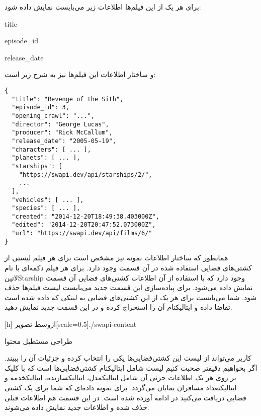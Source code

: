 برای هر یک از این فیلم‌ها اطلاعات زیر می‌بایست نمایش داده شود:

\begin{itemize}\begin{latinitems}
  \item title
  \item episode\_id
  \item release\_date
\end{latinitems}\end{itemize}

و ساختار اطلاعات این فیلم‌ها نیز به شرح زیر است:

\begin{latin}
\begin{verbatim}
{
  "title": "Revenge of the Sith",
  "episode_id": 3,
  "opening_crawl": "...",
  "director": "George Lucas",
  "producer": "Rick McCallum",
  "release_date": "2005-05-19",
  "characters": [ ... ],
  "planets": [ ... ],
  "starships": [
    "https://swapi.dev/api/starships/2/",
    ...
  ],
  "vehicles": [ ... ],
  "species": [ ... ],
  "created": "2014-12-20T18:49:38.403000Z",
  "edited": "2014-12-20T20:47:52.073000Z",
  "url": "https://swapi.dev/api/films/6/"
}
\end{verbatim}
\end{latin}

همانطور که ساختار اطلاعات نمونه نیز مشخص است برای هر فیلم لیستی از کشتی‌های فضایی استفاده شده در آن قسمت وجود دارد.
برای هر فیلم دکمه‌ای با نام ‌لاتین{Starship} وجود دارد که با استفاده از آن اطلاعات کشتی‌های فضایی آن قسمت نمایش داده می‌شود.
برای پیاده‌سازی این قسمت جدید می‌بایست لیست فیلم‌ها حذف شود.
شما می‌بایست برای هر یک از این کشتی‌های فضایی به لینکی که داده شده است تقاضا داده و ‌ایتالیک{نام} آن را استخراج کرده
و در این قسمت جدید نمایش دهید.

[h]
  ‌ازوسط
  ‌تصویر[scale=0.5]{./swapi-content}
  \caption{طراحی مستطیل محتوا}

کاربر می‌تواند از لیست این کشتی‌فضایی‌ها یکی را انتخاب کرده و جزئیات آن را ببیند.
اگر بخواهیم دقیقتر صحبت کنیم لیست شامل ‌ایتالیک{نام} کشتی‌فضایی‌ها است
که با کلیک بر روی هر یک اطلاعات جزئی آن شامل ‌ایتالیک{مدل}، ‌ایتالیک{سازنده}، ‌ایتالیک{خدمه} و ‌ایتالیک{تعداد مسافران} نمایان می‌گردد.
برای نمونه داده‌ای که شما برای یک کشتی فضایی دریافت می‌کنید در ادامه آورده شده است.
در این قسمت هم اطلاعات قبلی حذف شده و اطلاعات جدید نمایش داده می‌شوند.

